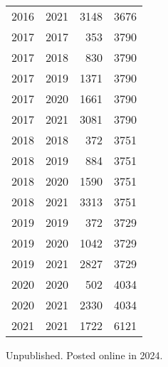 \documentclass[
  10pt,
  letterpaper,
  DIV=11,
  numbers=noendperiod,
  twoside]{scrartcl}
\begin{document}
\begin{longtable}[]{@{}rrrr@{}}
2016 & 2021 & 3148 & 3676 \\
2017 & 2017 & 353 & 3790 \\
2017 & 2018 & 830 & 3790 \\
2017 & 2019 & 1371 & 3790 \\
2017 & 2020 & 1661 & 3790 \\
2017 & 2021 & 3081 & 3790 \\
2018 & 2018 & 372 & 3751 \\
2018 & 2019 & 884 & 3751 \\
2018 & 2020 & 1590 & 3751 \\
2018 & 2021 & 3313 & 3751 \\
2019 & 2019 & 372 & 3729 \\
2019 & 2020 & 1042 & 3729 \\
2019 & 2021 & 2827 & 3729 \\
2020 & 2020 & 502 & 4034 \\
2020 & 2021 & 2330 & 4034 \\
2021 & 2021 & 1722 & 6121 \\

\end{longtable}



\noindent Unpublished. Posted online in 2024.
\end{document}
